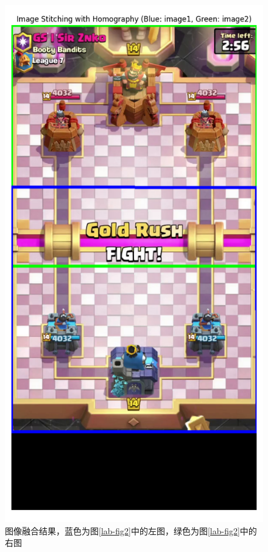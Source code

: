 \documentclass[12pt, a4paper, oneside]{ctexart}
\numberwithin{equation}{section}  %
\begin{document}
\begin{figure}[htbp]
    \centering
    \includegraphics[scale=0.5]{../code/results/3.png}
    \caption{图像融合结果，蓝色为图\ref{lab-fig2}中的左图，绿色为图\ref{lab-fig2}中的右图}
\end{figure}
\end{document}
